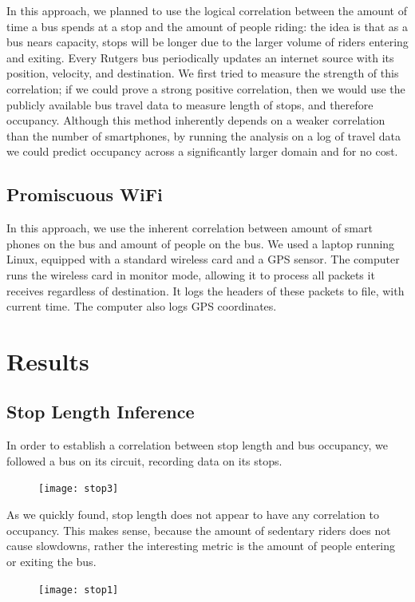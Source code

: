 \documentclass[letterpaper,english]{scrartcl}
\begin{document}
	In this approach, we planned to use the logical correlation between the amount of time a bus spends at a stop and the amount of people riding: the idea is that as a bus nears capacity, stops will be longer due to the larger volume of riders entering and exiting.
	Every Rutgers bus periodically updates an internet source with its position, velocity, and destination.
	We first tried to measure the strength of this correlation; if we could prove a strong positive correlation, then we would use the publicly available bus travel data to measure length of stops, and therefore occupancy.
	Although this method inherently depends on a weaker correlation than the number of smartphones, by running the analysis on a log of travel data we could predict occupancy across a significantly larger domain and for no cost.

	\subsection*{Promiscuous WiFi}

	In this approach, we use the inherent correlation between amount of smart phones on the bus and amount of people on the bus.
	We used a laptop running Linux, equipped with a standard wireless card and a GPS sensor.
	The computer runs the wireless card in monitor mode, allowing it to process all packets it receives regardless of destination. It logs the headers of these packets to file, with current time.
	The computer also logs GPS coordinates.

\section*{Results}

\subsection*{Stop Length Inference}
	In order to establish a correlation between stop length and bus occupancy, we followed a bus on its circuit, recording data on its stops.
	\begin{figure}[H]
	\texttt{[image: stop3]}
	\centering
	\end{figure}
	As we quickly found, stop length does not appear to have any correlation to occupancy.
	This makes sense, because the amount of sedentary riders does not cause slowdowns, rather the interesting metric is the amount of people entering or exiting the bus.

	\begin{figure}[H]
	\texttt{[image: stop1]}
	\centering
	\end{figure}
\end{document}
